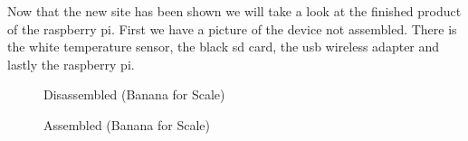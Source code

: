 \documentclass{report}
\begin{document}
\indent
Now that the new site has been shown we will take a look at the finished product of the raspberry pi. First we have a picture of the device not assembled. There is the white temperature sensor, the black sd card, the usb wireless adapter and lastly the raspberry pi.
\begin{figure}[H]
	\caption{Disassembled (Banana for Scale)}
\end{figure}
\begin{figure}[H]
	\caption{Assembled (Banana for Scale)}
\end{figure}
\newpage
\end{document}
